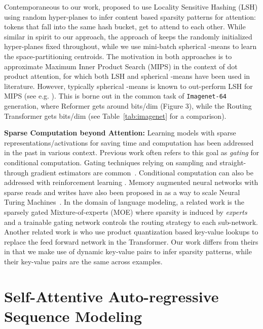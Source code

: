 \documentclass[a4paper]{article}
\begin{document}
Contemporaneous to our work, \citet{kitaev2020reformer} proposed to use Locality Sensitive Hashing (LSH)
using random hyper-planes to infer content based sparsity patterns for attention: tokens that fall into the same
hash bucket, get to attend to each other. While similar in spirit
to our approach, the approach of \citet{kitaev2020reformer} keeps the randomly initialized hyper-planes
fixed throughout, while we use mini-batch spherical -means to learn the space-partitioning centroids.
The motivation in both approaches is to approximate Maximum Inner Product Search (MIPS) in the context of
dot product attention, for which both LSH and spherical -means have been used in literature. However, 
typically spherical -means is known to out-perform LSH for MIPS (see e.g. \citet{auvolat2015clustering}).
This is borne out in the common task of \texttt{Imagenet-64} generation, 
where Reformer gets around  bits/dim (Figure 3), while the Routing Transformer gets  bits/dim (see Table~\ref{tab:imagenet} for a comparison).

{\bf Sparse Computation beyond Attention:}
Learning models with sparse representations/activations for saving time and computation
has been addressed in the past in various context. Previous work often refers to this goal as
\emph{gating} for conditional computation. Gating techniques relying on sampling and 
straight-through gradient estimators are common~\citep{bengio2013estimating,eigen2013learning,cho2014exponentially}. 
Conditional computation can also be addressed with reinforcement learning 
\citep{denoyer2014deep, indurthi2019look}. Memory augmented neural networks 
with sparse reads and writes have also been proposed in \citet{rae2016scaling}
as a way to scale Neural Turing Machines~\citep{graves2014neural}.
In the domain of language modeling, 
a related work is the sparsely gated Mixture-of-experts (MOE)  
\citep{shazeer2017outrageously} where sparsity is induced by \emph{experts} 
and a trainable gating network controls the routing strategy to each 
sub-network. Another related work is \citet{lample2019large} who use product
quantization based key-value lookups to replace the feed forward network
in the Transformer. Our work differs from theirs in that we make use of dynamic
key-value pairs to infer sparsity patterns, while their key-value pairs are
the same across examples.
\section{Self-Attentive Auto-regressive Sequence Modeling}
\label{sec:attention}
\end{document}
